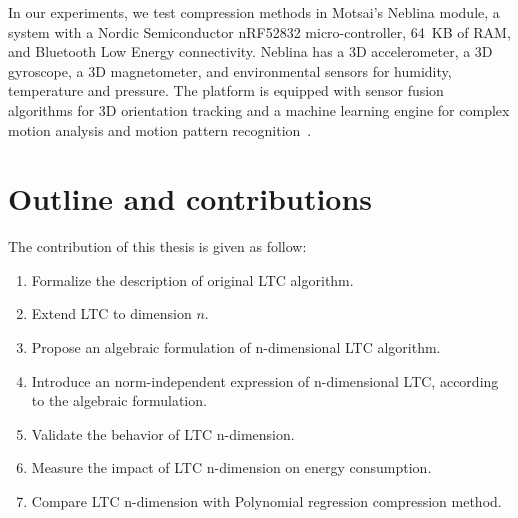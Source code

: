 
In our experiments, we test compression methods in Motsai's Neblina module, a
system with a Nordic Semiconductor nRF52832 micro-controller, 64~KB of RAM, and
Bluetooth Low Energy connectivity. Neblina has a 3D accelerometer, a 3D
gyroscope, a 3D magnetometer, and environmental sensors for humidity,
temperature and pressure. The platform is equipped with sensor fusion algorithms
for 3D orientation tracking and a machine learning engine for complex motion
analysis and motion pattern recognition~\cite{sarbishei2016accuracy}.


\section{Outline and contributions}





The contribution of this thesis is given as follow:
\begin{enumerate}
  \item Formalize the description of original LTC algorithm.
  \item Extend LTC to dimension $n$.
  \item Propose an algebraic formulation of n-dimensional LTC algorithm.
  \item Introduce an norm-independent expression of n-dimensional LTC, according
  to the algebraic formulation.
  \item Validate the behavior of LTC n-dimension.
  \item Measure the impact of LTC n-dimension on energy consumption.
  \item Compare LTC n-dimension with Polynomial regression compression method.
\end{enumerate}

